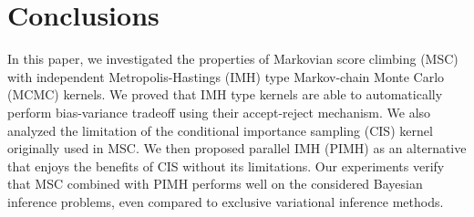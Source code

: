 
\vspace{-0.12in}
\section{Conclusions}
\vspace{-0.08in}
In this paper, we investigated the properties of Markovian score climbing (MSC) with independent Metropolis-Hastings (IMH) type Markov-chain Monte Carlo (MCMC) kernels.
We proved that IMH type kernels are able to automatically perform bias-variance tradeoff using their accept-reject mechanism.
We also analyzed the limitation of the conditional importance sampling (CIS) kernel originally used in MSC.
We then proposed parallel IMH (PIMH) as an alternative that enjoys the benefits of CIS without its limitations.
Our experiments verify that MSC combined with PIMH performs well on the considered Bayesian inference problems, even compared to exclusive variational inference methods.


